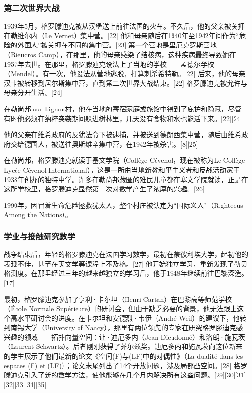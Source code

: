 \subsubsection{第二次世界大战}  
1939年5月，格罗滕迪克被从汉堡送上前往法国的火车。不久后，他的父亲被关押在勒维尔内（Le Vernet）集中营。[22] 他和母亲随后在1940年至1942年间作为“危险的外国人”被关押在不同的集中营。[23] 第一个营地是里厄克罗斯营地（Rieucros Camp），在那里，他的母亲感染了结核病，这种疾病最终导致她在1957年去世。在那里，格罗滕迪克设法上了当地的学校——孟德尔学校（Mendel）。有一次，他设法从营地逃脱，打算刺杀希特勒。[22] 后来，他的母亲汉卡被转移到居尔斯集中营，直到第二次世界大战结束。[22] 格罗滕迪克被允许与母亲分开生活。[24]

在勒尚邦-sur-Lignon村，他在当地的寄宿家庭或旅馆中得到了庇护和隐藏，尽管有时他必须在纳粹突袭期间躲进树林里，几天没有食物和水也能活下来。[22][24]

他的父亲在维希政府的反犹法令下被逮捕，并被送到德朗西集中营，随后由维希政府交给德国人，被送往奥斯维辛集中营，在1942年被杀害。[8][25]

在勒尚邦，格罗滕迪克就读于塞文学院（Collège Cévenol，现在被称为Le Collège-Lycée Cévenol International），这是一所由当地新教和平主义者和反战活动家于1938年创办的独特中学。许多在勒尚邦藏匿的难民儿童都在塞文学院就读，正是在这所学校里，格罗滕迪克显然第一次对数学产生了浓厚的兴趣。[26]

1990年，因冒着生命危险拯救犹太人，整个村庄被认定为“国际义人”（Righteous Among the Nations）。
\subsubsection{学业与接触研究数学}  
战争结束后，年轻的格罗滕迪克在法国学习数学，最初在蒙彼利埃大学，起初他的表现不佳，甚至在天文学等课程上不及格。[27] 他开始独立学习，重新发现了勒贝格测度。在那里经过三年的越来越独立的学习后，他于1948年继续前往巴黎深造。[17]

最初，格罗滕迪克参加了亨利·卡尔坦（Henri Cartan）在巴黎高等师范学校（École Normale Supérieure）的研讨会，但由于缺乏必要的背景，他无法跟上这个高水平研讨会的进度。在卡尔坦和安德烈·韦伊（André Weil）的建议下，他转到南锡大学（University of Nancy），那里有两位领先的专家在研究格罗滕迪克感兴趣的领域——拓扑向量空间：让·迪厄多内（Jean Dieudonné）和洛朗·施瓦茨（Laurent Schwartz）。后者刚刚获得了菲尔兹奖。迪厄多内和施瓦茨向这位新来的学生展示了他们最新的论文《空间(F)与(LF)中的对偶性》（La dualité dans les espaces (F) et (LF)）；论文末尾列出了14个开放问题，涉及局部凸空间。[28] 格罗滕迪克引入了新的数学方法，使他能够在几个月内解决所有这些问题。[29][30][31][32][33][34][35]

